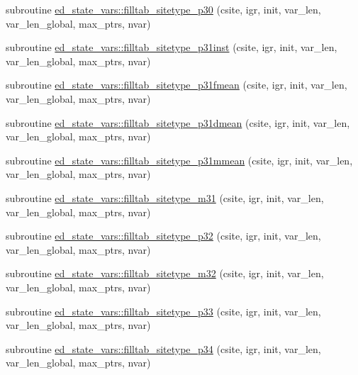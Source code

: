 \begin{DoxyCompactItemize}
\item 
subroutine \hyperlink{namespaceed__state__vars_a556ff3dcf4b87ae8fe4e3319e1196d27}{ed\+\_\+state\+\_\+vars\+::filltab\+\_\+sitetype\+\_\+p30} (csite, igr, init, var\+\_\+len, var\+\_\+len\+\_\+global, max\+\_\+ptrs, nvar)
\item 
subroutine \hyperlink{namespaceed__state__vars_a8bc8b68929a7a916f6b7935bb29a633a}{ed\+\_\+state\+\_\+vars\+::filltab\+\_\+sitetype\+\_\+p31inst} (csite, igr, init, var\+\_\+len, var\+\_\+len\+\_\+global, max\+\_\+ptrs, nvar)
\item 
subroutine \hyperlink{namespaceed__state__vars_a195c33fe08578b92692e488eb565861d}{ed\+\_\+state\+\_\+vars\+::filltab\+\_\+sitetype\+\_\+p31fmean} (csite, igr, init, var\+\_\+len, var\+\_\+len\+\_\+global, max\+\_\+ptrs, nvar)
\item 
subroutine \hyperlink{namespaceed__state__vars_ab7a9ec8185269ed2dda4bf9538a21416}{ed\+\_\+state\+\_\+vars\+::filltab\+\_\+sitetype\+\_\+p31dmean} (csite, igr, init, var\+\_\+len, var\+\_\+len\+\_\+global, max\+\_\+ptrs, nvar)
\item 
subroutine \hyperlink{namespaceed__state__vars_a89840a7049b8ec0e90010deda231bcdc}{ed\+\_\+state\+\_\+vars\+::filltab\+\_\+sitetype\+\_\+p31mmean} (csite, igr, init, var\+\_\+len, var\+\_\+len\+\_\+global, max\+\_\+ptrs, nvar)
\item 
subroutine \hyperlink{namespaceed__state__vars_aeda801ceb00e5700d0dc3175a0937d16}{ed\+\_\+state\+\_\+vars\+::filltab\+\_\+sitetype\+\_\+m31} (csite, igr, init, var\+\_\+len, var\+\_\+len\+\_\+global, max\+\_\+ptrs, nvar)
\item 
subroutine \hyperlink{namespaceed__state__vars_a42452cec3810c62dd8c72e2d58476bcd}{ed\+\_\+state\+\_\+vars\+::filltab\+\_\+sitetype\+\_\+p32} (csite, igr, init, var\+\_\+len, var\+\_\+len\+\_\+global, max\+\_\+ptrs, nvar)
\item 
subroutine \hyperlink{namespaceed__state__vars_a6f5ed492902141d24d2bd008dd7b68c1}{ed\+\_\+state\+\_\+vars\+::filltab\+\_\+sitetype\+\_\+m32} (csite, igr, init, var\+\_\+len, var\+\_\+len\+\_\+global, max\+\_\+ptrs, nvar)
\item 
subroutine \hyperlink{namespaceed__state__vars_ae53d37359e4395c526fd65a95f76c428}{ed\+\_\+state\+\_\+vars\+::filltab\+\_\+sitetype\+\_\+p33} (csite, igr, init, var\+\_\+len, var\+\_\+len\+\_\+global, max\+\_\+ptrs, nvar)
\item 
subroutine \hyperlink{namespaceed__state__vars_acf64db19aff9106beb2c20eecbe6afa9}{ed\+\_\+state\+\_\+vars\+::filltab\+\_\+sitetype\+\_\+p34} (csite, igr, init, var\+\_\+len, var\+\_\+len\+\_\+global, max\+\_\+ptrs, nvar)

\end{DoxyCompactItemize}
